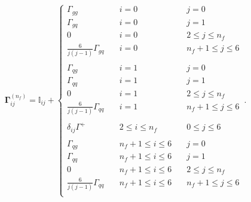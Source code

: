 \documentclass[10pt,a4paper]{article}
\begin{document}
\begin{equation}\label{eq:evolopalg}
  {\bm\Gamma}^{(n_f)}_{ij}=\mathbb{I}_{ij}+
  \left\{
\begin{array}{lll}
\Gamma_{gg} & \quad i = 0 &\quad j = 0\\
\Gamma_{gq} & \quad i = 0 & \quad j=1\\
0 &\quad i = 0 & \quad 2 \leq j \leq n_f\\
\frac{6}{j(j-1)}\Gamma_{gq} &\quad i = 0 & \quad n_f+1 \leq j \leq 6\\
\\
\Gamma_{qg} & \quad i = 1 & \quad j = 0\\
\Gamma_{qq} & \quad i = 1 & \quad j = 1\\
0 &\quad i = 1 & \quad 2 \leq j \leq n_f\\
\frac{6}{j(j-1)}\Gamma_{qq} &\quad i = 1 & \quad n_f+1 \leq j \leq 6\\
\\
\delta_{ij}\Gamma^+ & \quad 2 \leq i \leq n_f & \quad 0 \leq j \leq 6\\
\\
\Gamma_{qg} & \quad n_f+1 \leq i \leq 6  &\quad j = 0\\
\Gamma_{qq} & \quad n_f+1 \leq i \leq 6  & \quad j=1\\
0 &\quad n_f+1 \leq i \leq 6 & \quad 2 \leq j \leq n_f\\
\frac{6}{j(j-1)}\Gamma_{qq} &\quad n_f+1 \leq i \leq 6 & \quad n_f+1 \leq j \leq 6\\
\end{array}
\right.\,.
\end{equation}
\end{document}
